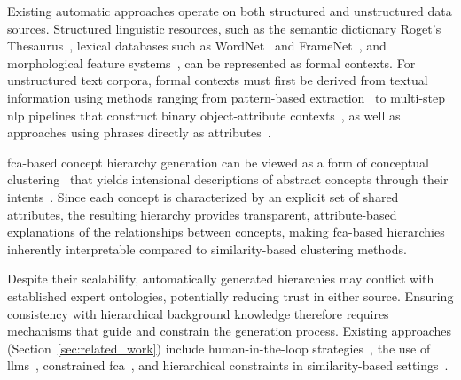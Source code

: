 Existing automatic approaches operate on both structured and unstructured data sources.
Structured linguistic resources, such as the semantic dictionary Roget's Thesaurus~\cite{Priss:2004,old:04,Priss:96}, lexical databases such as WordNet~\cite{Priss:96,priss:98,GalnPez2014DiscoveringNS} and FrameNet~\cite{val:05}, and morphological feature systems~\cite{sporleder:02,petersen:04}, can be represented as formal contexts.
For unstructured text corpora, formal contexts must first be derived from textual information using methods ranging from pattern-based extraction~\cite{hearst1992hyponyms,le2019inferring} to multi-step \acl{nlp} pipelines that construct binary object-attribute contexts~\cite{cimiano_learning_2005}, as well as approaches using phrases directly as attributes~\cite{Elzinga:09,cigarran_twitter_fca_2016}.


\ac{fca}-based concept hierarchy generation can be viewed as a form of conceptual clustering~\cite{Cimiano2004ComparingCD} that yields intensional descriptions of abstract concepts through their intents~\cite{cimiano_learning_2005}. 
Since each concept is characterized by an explicit set of shared attributes, the resulting hierarchy provides transparent, attribute-based explanations of the relationships between concepts, making \ac{fca}-based hierarchies inherently interpretable compared to similarity-based clustering methods.

Despite their scalability, automatically generated hierarchies may conflict with established expert ontologies, potentially reducing trust in either source.
Ensuring consistency with hierarchical background knowledge therefore requires mechanisms that guide and constrain the generation process.
Existing approaches (Section~\ref{sec:related_work}) include human-in-the-loop strategies~\cite{yang2012personalized}, the use of \acp{llm}~\cite{kommineni2024from,zhang2025teleclass}, constrained \ac{fca}~\cite{belohlavek2011selecting,belohlavek2009formal,belohlavek2006formal,hidayat_constrained_fca_2024,mao_constrained_fca_2017}, and hierarchical constraints in similarity-based settings~\cite{bade2006personalized,bade_hierarchical_2014}. 

